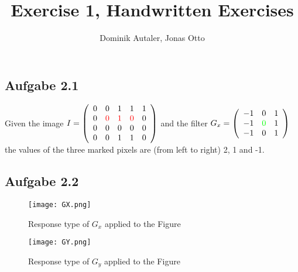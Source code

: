 \documentclass[12pt,a4paper]{article}
\begin{document}
\setlength{\parindent}{0pt}


\title{Exercise 1, Handwritten Exercises}
\author{Dominik Autaler, Jonas Otto}

\maketitle

\section{}

\subsection{Aufgabe 2.1}
Given the image $I = \left( \begin{array}{rrrrr}0 & 0 & 1 & 1 & 1 \\0 & \color{red}0 & \color{red}1 & \color{red}0 & 0\\0 & 0 & 0 & 0 & 0\\0 & 0 & 1 & 1 & 0\\\end{array}\right) $ and the filter $G_x = \left( \begin{array}{rrr}-1 & 0 & 1\\-1 & \color{green}0 & 1\\-1 & 0 & 1\\\end{array}\right)$ the values of the three marked pixels are (from left to right) 2, 1 and -1.

\subsection{Aufgabe 2.2}
\begin{figure}[h]
	\begin{center}
		\texttt{[image: GX.png]}
		\caption{Response type of $G_x$ applied to the Figure} 
	\end{center}
\end{figure}

\begin{figure}[h]
	\begin{center}
		\texttt{[image: GY.png]}
		\caption{Response type of $G_y$ applied to the Figure} 
	\end{center}
\end{figure}
\end{document}
